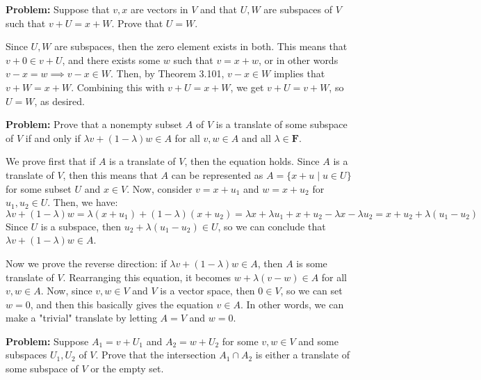 \documentclass[10pt]{article}
\newcommand{\F}{\mathbf F}
\newenvironment{problem}{\textbf{Problem:}}{}
\begin{document}
	\begin{problem}
		Suppose that \( v,x \) are vectors in \( V \) and that \( U, W \) are subspaces of \( V \) such that 
		\( v + U = x + W \). Prove that \( U = W \).
	\end{problem}

	\begin{solution}
		Since \( U, W \) are subspaces, then the zero element exists in both. This means that \( v + 0 \in v + U \), 
		and there exists some \( w \) such that \( v = x + w \), or in other words \( v - x = w 
		\implies v - x \in W\). Then, by Theorem 3.101, \( v - x \in W \) implies that \( v + W = 
		x + W\). Combining this with \( v + U = x + W \), we get \( v + U = v + W \), so \( U = W \), as 
		desired. 
	\end{solution}

	\begin{problem}
		Prove that a nonempty subset \( A \) of \( V \) is a translate of some subspace of \( V \) if 
		and only if \( \lambda v + (1 - \lambda) w \in A \) for all \( v, w \in A \) and all \( \lambda \in \F \). 
	\end{problem}

	\begin{solution}
		We prove first that if \( A \) is a translate of \( V \), then the equation holds. Since \( A \) is 
		a translate of \( V \), then this means that \( A \) can be represented as \( A = 
		\{x + u \mid u \in U\} \) for some subset \( U \) and \( x \in V \). Now, consider 
		\( v = x + u_1 \) and \( w = x + u_2 \) for \( u_1, u_2 \in U \). Then, we have:
		\[
		\lambda v + (1 - \lambda)w = \lambda(x + u_1) + (1 - \lambda)(x + u_2) = \lambda x + \lambda u_1 + x + u_2
		- \lambda x - \lambda u_2 = x + u_2 + \lambda(u_1 - u_2)
		\] 
		Since \( U \) is a subspace, then \( u_2 + \lambda(u_1 - u_2) \in U \), so 
		we can conclude that \( \lambda v + (1 - \lambda)w \in A \). 

		Now we prove the reverse direction: if \( \lambda v + (1 - \lambda)w \in A \), then 
		\( A \) is some translate of \( V \). Rearranging this equation, it becomes \( w + \lambda(v - w) \in A\)
		for all \( v, w \in A \). Now, since \( v, w \in V \) and \( V \) is a vector space, then \( 0 \in V \), 
		so we can set \( w = 0 \), and then this basically gives the equation \( v \in A \). In other words, 
		we can make a "trivial" translate by letting \( A = V \) and \( w = 0  \). 
	\end{solution}

	\begin{problem}
		Suppose \( A_1 = v + U_1 \) and \( A_2 = w + U_2 \) for some \( v, w \in V \) and some 
		subspaces \( U_1, U_2  \) of \( V \). Prove that the intersection \( A_1 \cap A_2 \) is either 
		a translate of some subspace of \( V \) or the empty set. 
	\end{problem}
\end{document}
